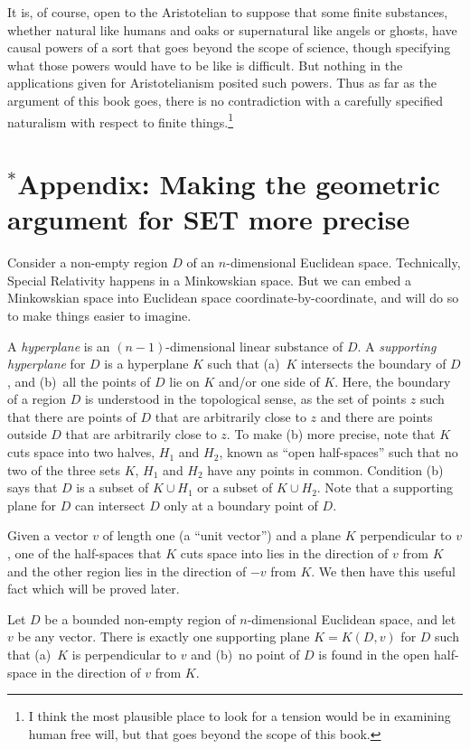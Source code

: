 It is, of course, open to the Aristotelian to suppose that some finite substances, whether natural like humans and oaks 
or  supernatural like angels or ghosts, have causal powers of a sort that goes beyond the scope of science, though
specifying what those powers would have to be like is difficult. But nothing in the applications given for Aristotelianism
posited such powers. Thus as far as the argument of this book goes, there is no contradiction with a carefully
specified naturalism with respect to finite things.\footnote{I think the most plausible place to look for a tension 
would be in examining human free will, but that goes beyond the scope of this book.}

\section*{$^*$Appendix: Making the geometric argument for SET more precise}
Consider a non-empty region $D$ of an $n$-dimensional Euclidean space. Technically, Special Relativity happens in a 
Minkowskian space. But we can embed a Minkowskian space into Euclidean space coordinate-by-coordinate, and will do so 
to make things easier to imagine.

A \textit{hyperplane} is an $(n-1)$-dimensional linear substance of $D$. A \textit{supporting hyperplane} for $D$ is a hyperplane $K$ such that (a)~$K$ intersects the  boundary of $D$, and (b)~all the points of $D$ lie on $K$ and/or one side of $K$. Here, the boundary of a region $D$ is understood in the topological sense, as the set of points $z$ such that there are points of $D$ that are arbitrarily close to $z$ and there are points outside $D$ that are arbitrarily close to $z$. To make (b) more precise, note that $K$ cuts space into two halves, $H_1$ and $H_2$, known as “open half-spaces” such that no two of the three sets $K$, $H_1$ and $H_2$ have any points in common. Condition (b) says that $D$ is a subset of $K\cup H_1$ or a subset of $K\cup H_2$.
Note that a supporting plane for $D$ can intersect $D$ only at a boundary point of $D$. 

Given a vector $v$ of length one (a ``unit vector'') and a plane $K$ perpendicular to $v$, one of the half-spaces that $K$ cuts space into lies in the direction of $v$ from $K$ and the other region lies in the direction of $-v$ from $K$.  We then have this 
useful fact which will be proved later.

\begin{lem}\label{lem:one-supp} Let $D$ be a bounded non-empty region of $n$-dimensional Euclidean space, and let $v$ be any vector. There is exactly one supporting plane $K=K(D,v)$ for $D$ such that (a)~$K$ is perpendicular to $v$ and (b)~no point of $D$ is found in the open half-space in the direction of $v$ from $K$.
\end{lem}

